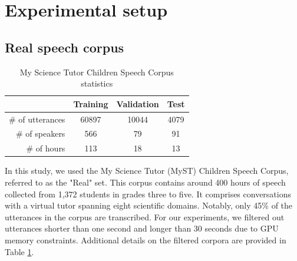 \section{Experimental setup}
\label{section:methods}

\subsection{Real speech corpus}
\begin{table}[h!]
\caption{My Science Tutor Children Speech Corpus statistics}

\begin{center}
\begin{tabular}{r|c|c|c}
\hline
 & Training & Validation     & Test   \\ \hline
\# of utterances & 60897   & 10044    & 4079  \\ 
\# of speakers & 566   & 79    & 91  \\ 
\# of hours & 113   & 18    & 13  \\ \hline
\end{tabular}
\label{tab:statistics}
\end{center}
\end{table}
In this study, we used the My Science Tutor (MyST) Children Speech Corpus, referred to as the "Real" set. This corpus contains around 400 hours of speech collected from 1,372 students in grades three to five. It comprises conversations with a virtual tutor spanning eight scientific domains. 
Notably, only 45\% of the utterances in the corpus are transcribed. For our experiments, we filtered out utterances shorter than one second and longer than 30 seconds due to GPU memory constraints. Additional details on the filtered corpora are provided in Table \ref{tab:statistics}.

